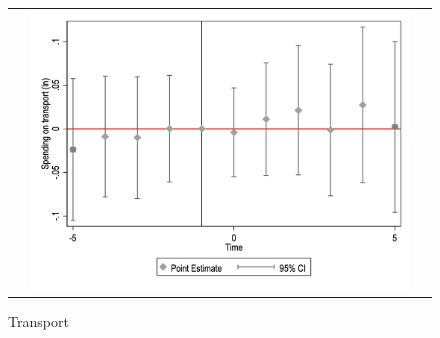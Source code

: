 \begin{figure}[!ht]
\begin{tabular}{@{}ccc@{}}
\begin{minipage}[t]{0.32\textwidth}
            \label{fig:sport}
        \end{minipage} &
        \begin{minipage}[t]{0.32\textwidth}
            \centering
            \caption{Transport}
            \includegraphics[width=\linewidth]{images/pop_100000/eventdd_ln_q4_08_step1.jpg}
            \label{fig:transport}
        \end{minipage} \\[10pt]


\end{tabular}
\end{figure}
